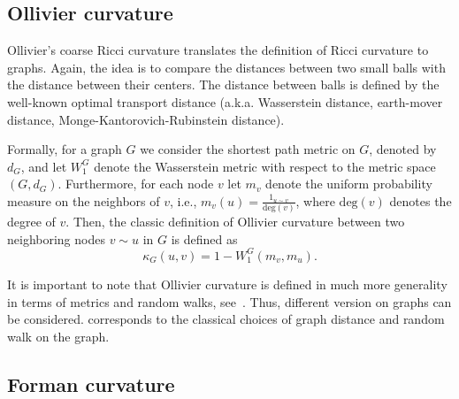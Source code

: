 \documentclass{article} %
\begin{document}
\subsection{Ollivier curvature}

Ollivier's coarse Ricci curvature translates the definition of Ricci curvature to graphs. 
Again, the idea is to compare the distances between two small balls with the
distance between their centers. 
The distance between balls is defined by the well-known optimal transport
distance (a.k.a. Wasserstein distance, earth-mover distance,
Monge-Kantorovich-Rubinstein distance).

Formally, for a graph $G$ we consider the shortest path metric on $G$, denoted by $d_G$, and let $W_1^G$ denote the Wasserstein metric with respect to the metric space $(G,d_G)$. Furthermore, for each node $v$ let $m_v$ denote the uniform probability measure on the neighbors of $v$, i.e., $m_v(u) = \frac{1_{u \sim v}}{\mathrm{deg}(v)}$, where $\mathrm{deg}(v)$ denotes the degree of $v$. Then, the classic definition of Ollivier curvature between two neighboring nodes $v \sim u$ in $G$ is defined as
\begin{equation}\label{eq:def_classic_ollivier_graphs}
	\kappa_G(u,v) = 1 - W_1^G(m_v, m_u).
\end{equation}

It is important to note that Ollivier curvature is defined in much more generality in terms of metrics and random walks, see~\citep{ollivier2009ricci}. Thus, different version on graphs can be considered.  corresponds to the classical choices of graph distance and random walk on the graph.




\subsection{Forman curvature}
\end{document}
